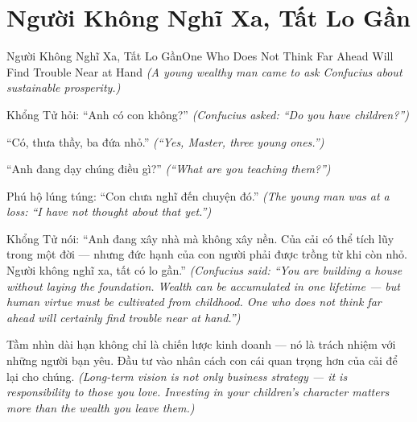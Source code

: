 \section{Người Không Nghĩ Xa, Tất Lo Gần}
\begin{truyen}{Người Không Nghĩ Xa, Tất Lo Gần}{One Who Does Not Think Far Ahead Will Find Trouble Near at Hand}
\textit{(A young wealthy man came to ask Confucius about sustainable prosperity.)}

Khổng Tử hỏi: ``Anh có con không?''
\textit{(Confucius asked: ``Do you have children?'')}

``Có, thưa thầy, ba đứa nhỏ.''
\textit{(``Yes, Master, three young ones.'')}

``Anh đang dạy chúng điều gì?''
\textit{(``What are you teaching them?'')}

Phú hộ lúng túng: ``Con chưa nghĩ đến chuyện đó.''
\textit{(The young man was at a loss: ``I have not thought about that yet.'')}

Khổng Tử nói: ``Anh đang xây nhà mà không xây nền. Của cải có thể tích lũy trong một đời — nhưng đức hạnh của con người phải được trồng từ khi còn nhỏ. Người không nghĩ xa, tất có lo gần.''
\textit{(Confucius said: ``You are building a house without laying the foundation. Wealth can be accumulated in one lifetime — but human virtue must be cultivated from childhood. One who does not think far ahead will certainly find trouble near at hand.'')}

\end{truyen}

\begin{baihoc}
Tầm nhìn dài hạn không chỉ là chiến lược kinh doanh — nó là trách nhiệm với những người bạn yêu. Đầu tư vào nhân cách con cái quan trọng hơn của cải để lại cho chúng.
\textit{(Long-term vision is not only business strategy — it is responsibility to those you love. Investing in your children's character matters more than the wealth you leave them.)}
\end{baihoc}
